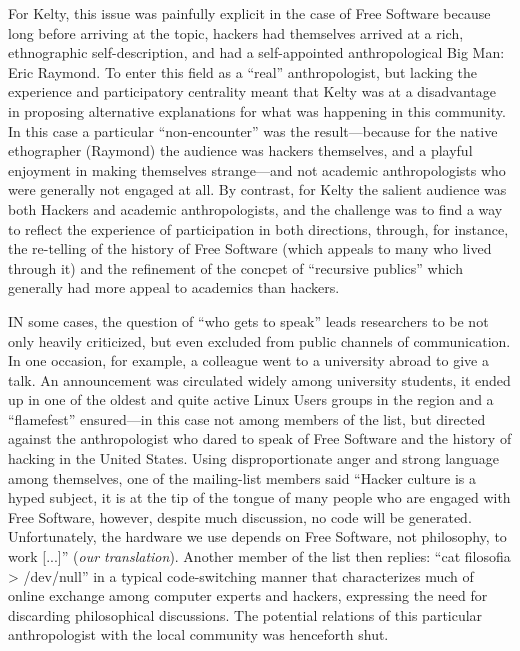 \documentclass[10pt,letter,oneside]{scrartcl}
\begin{document}
For Kelty, this issue was painfully explicit in the case of Free
Software because long before arriving at the topic, hackers had
themselves arrived at a rich, ethnographic self-description, and had a
self-appointed anthropological Big Man: Eric Raymond.  To enter this
field as a ``real'' anthropologist, but lacking the experience and
participatory centrality meant that Kelty was at a disadvantage in
proposing alternative explanations for what was happening in this
community.  In this case a particular ``non-encounter'' was the
result---because for the native ethographer (Raymond) the audience was
hackers themselves, and a playful enjoyment in making themselves
strange---and not academic anthropologists who were generally not
engaged at all.  By contrast, for Kelty the salient audience was both
Hackers and academic anthropologists, and the challenge was to find a
way to reflect the experience of participation in both directions,
through, for instance, the re-telling of the history of Free Software
(which appeals to many who lived through it) and the refinement of the
concpet of ``recursive publics'' which generally had more appeal to
academics than hackers.   

IN some cases, the question of ``who gets to speak'' leads researchers
to be not only heavily criticized, but even excluded from public
channels of communication.  In one occasion, for example, a
colleague went to a university abroad to give a talk. An 
announcement was circulated widely among university students, it
ended up in one of the oldest and quite active Linux Users groups in
the region and a ``flamefest'' ensured---in this case not among members of
the list, but directed  against the anthropologist who dared to speak of Free
Software and the history of hacking in the United States. Using
disproportionate anger and strong language among themselves, one of
the mailing-list members said ``Hacker culture is a hyped subject, it
is at the tip of the tongue of many people who are engaged with Free
Software, however, despite much discussion, no code will be
generated. Unfortunately, the hardware we use depends on Free
Software, not philosophy, to work {[}...{]}'' (\emph{our
  translation}). Another member of the list then replies: ``cat
filosofia \textgreater{} /dev/null'' in a typical code-switching
manner that characterizes much of online exchange among computer
experts and hackers, expressing the need for discarding philosophical
discussions. The potential relations of this particular anthropologist
with the local community was henceforth shut.
\end{document}
